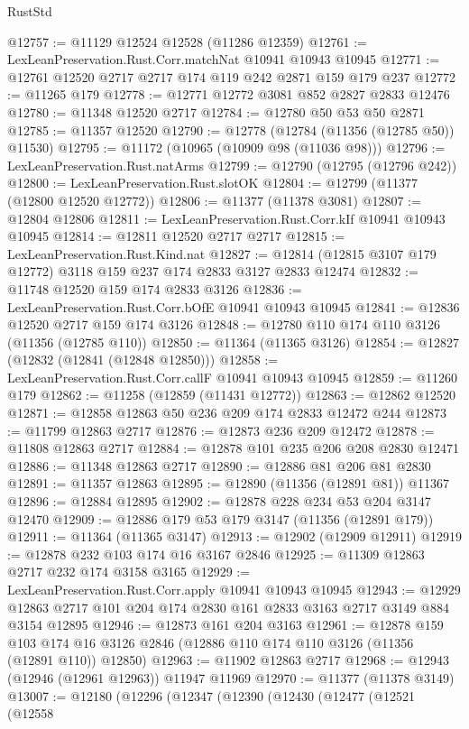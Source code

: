 \begin{lexlean}{RustStd}
\begin{coremodule}
@12757 := @11129 @12524 @12528 (@11286 @12359)
@12761 := LexLeanPreservation.Rust.Corr.matchNat @10941 @10943 @10945
@12771 := @12761 @12520 @2717 @2717 @174 @119 @242 @2871 @159 @179 @237
@12772 := @11265 @179
@12778 := @12771 @12772 @3081 @852 @2827 @2833 @12476
@12780 := @11348 @12520 @2717
@12784 := @12780 @50 @53 @50 @2871
@12785 := @11357 @12520
@12790 := @12778 (@12784 (@11356 (@12785 @50)) @11530)
@12795 := @11172 (@10965 (@10909 @98 (@11036 @98)))
@12796 := LexLeanPreservation.Rust.natArms
@12799 := @12790 (@12795 (@12796 @242))
@12800 := LexLeanPreservation.Rust.slotOK
@12804 := @12799 (@11377 (@12800 @12520 @12772))
@12806 := @11377 (@11378 @3081)
@12807 := @12804 @12806
@12811 := LexLeanPreservation.Rust.Corr.kIf @10941 @10943 @10945
@12814 := @12811 @12520 @2717 @2717
@12815 := LexLeanPreservation.Rust.Kind.nat
@12827 := @12814 (@12815 @3107 @179 @12772) @3118 @159 @237 @174 @2833 @3127 @2833 @12474
@12832 := @11748 @12520 @159 @174 @2833 @3126
@12836 := LexLeanPreservation.Rust.Corr.bOfE @10941 @10943 @10945
@12841 := @12836 @12520 @2717 @159 @174 @3126
@12848 := @12780 @110 @174 @110 @3126 (@11356 (@12785 @110))
@12850 := @11364 (@11365 @3126)
@12854 := @12827 (@12832 (@12841 (@12848 @12850)))
@12858 := LexLeanPreservation.Rust.Corr.callF @10941 @10943 @10945
@12859 := @11260 @179
@12862 := @11258 (@12859 (@11431 @12772))
@12863 := @12862 @12520
@12871 := @12858 @12863 @50 @236 @209 @174 @2833 @12472 @244
@12873 := @11799 @12863 @2717
@12876 := @12873 @236 @209 @12472
@12878 := @11808 @12863 @2717
@12884 := @12878 @101 @235 @206 @208 @2830 @12471
@12886 := @11348 @12863 @2717
@12890 := @12886 @81 @206 @81 @2830
@12891 := @11357 @12863
@12895 := @12890 (@11356 (@12891 @81)) @11367
@12896 := @12884 @12895
@12902 := @12878 @228 @234 @53 @204 @3147 @12470
@12909 := @12886 @179 @53 @179 @3147 (@11356 (@12891 @179))
@12911 := @11364 (@11365 @3147)
@12913 := @12902 (@12909 @12911)
@12919 := @12878 @232 @103 @174 @16 @3167 @2846
@12925 := @11309 @12863 @2717 @232 @174 @3158 @3165
@12929 := LexLeanPreservation.Rust.Corr.apply @10941 @10943 @10945
@12943 := @12929 @12863 @2717 @101 @204 @174 @2830 @161 @2833 @3163 @2717 @3149 @884 @3154 @12895
@12946 := @12873 @161 @204 @3163
@12961 := @12878
    @159
    @103
    @174
    @16
    @3126
    @2846
    (@12886 @110 @174 @110 @3126 (@11356 (@12891 @110)) @12850)
@12963 := @11902 @12863 @2717
@12968 := @12943 (@12946 (@12961 @12963)) @11947 @11969
@12970 := @11377 (@11378 @3149)
@13007 := @12180
    (@12296
      (@12347
        (@12390
          (@12430
            (@12477
              (@12521
                (@12558

\end{coremodule}
\end{lexlean}
